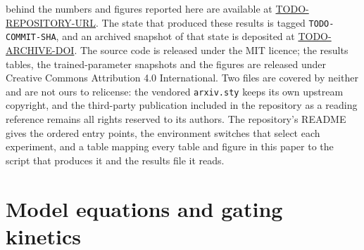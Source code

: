 \documentclass{article}
\begin{document}
behind the numbers and figures reported here are available at
\url{TODO-REPOSITORY-URL}. The state that produced these results is tagged
\texttt{TODO-COMMIT-SHA}, and an archived snapshot of that state is deposited at
\url{TODO-ARCHIVE-DOI}. The source code is released under the MIT licence; the
results tables, the trained-parameter snapshots and the figures are released
under Creative Commons Attribution 4.0 International. %
Two files are covered by neither and are not ours to relicense: the vendored
\texttt{arxiv.sty} keeps its own upstream copyright, and the third-party
publication included in the repository as a reading reference remains all rights
reserved to its authors.
The repository's README gives the ordered entry points, the environment switches
that select each experiment, and a table mapping every table and figure in this
paper to the script that produces it and the results file it reads.




\appendix
\section{Model equations and gating kinetics}
\label{app:eqns}
\end{document}
